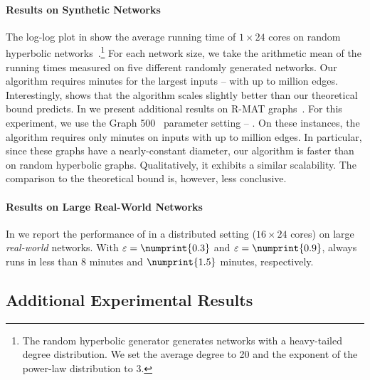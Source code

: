 \paragraph{Results on Synthetic Networks}
The log-log plot in  show the average running time
of \ust $1\times24$ cores on random hyperbolic
networks~\cite{DBLP:conf/hpec/LoozOLM16}.\footnote{The random hyperbolic generator generates
networks with a heavy-tailed degree distribution. We set the average degree to 20 and the
exponent of the power-law distribution to 3.}
For each network size, we take the arithmetic mean of the running times
measured on five different randomly generated networks.
Our algorithm requires \maxTimeHyp minutes for the largest inputs
-- with up to \maxEdgesHyp million edges.
Interestingly,  shows that the algorithm
scales slightly better than our theoretical bound predicts.
In  we present additional results on R-MAT
graphs~\cite{DBLP:conf/sdm/ChakrabartiZF04}. For this experiment, we use the
Graph 500~\cite{murphy2010introducing} parameter setting -- \ie \graphfh.
On these instances, the algorithm requires only \maxTimeRmat minutes on inputs
with up to \maxEdgesRmat million edges.
In particular, since these graphs have a nearly-constant diameter,
our algorithm is faster than on random hyperbolic graphs.
Qualitatively, it exhibits a similar scalability. The comparison to the theoretical
bound is, however, less conclusive.

\paragraph{Results on Large Real-World Networks}
\begin{table}[tb]
\centering
\small
{}
\label{tab:el-clos:el-clos-time-cluster}

\end{table}

In  we report the performance of \ust in
a distributed setting ($16\times 24$ cores) on large \emph{real-world} networks.
With $\epsilon = \numprint{0.3}$ and $\epsilon = \numprint{0.9}$, \ust always runs
in less than 8 minutes and $\numprint{1.5}$ minutes, respectively.

\subsection{Additional Experimental Results}
\label{sec:el-clos:rel-err-results}
